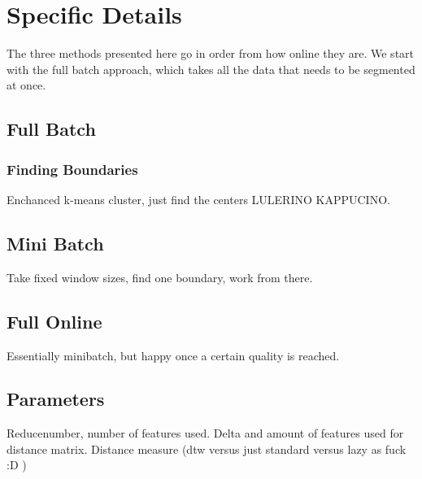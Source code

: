 \section{Specific Details}
The three methods presented here go in order from how online they are. We start with the full batch approach, which takes all the data that needs to be segmented at once.
\subsection{Full Batch}
\subsubsection{Finding Boundaries}
Enchanced k-means cluster, just find the centers LULERINO KAPPUCINO. 
\subsection{Mini Batch}
Take fixed window sizes, find one boundary, work from there. 
\subsection{Full Online}
Essentially minibatch, but happy once a certain quality is reached.
\subsection{Parameters}
Reducenumber, number of features used. Delta and amount of features used for distance matrix. Distance measure (dtw versus just standard versus lazy as fuck :D )
